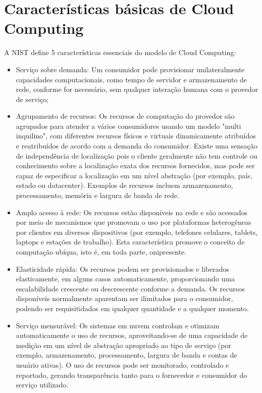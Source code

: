 \section{Características básicas de Cloud Computing}
	A NIST define 5 características essenciais do modelo de Cloud Computing:
	\begin{itemize}
		\item
			Serviço sobre demanda: Um consumidor pode provisionar unilateralmente capacidades computacionais, como tempo de servidor e armazenamento de rede, conforme for necessário, sem qualquer interação humana com o provedor de serviço;
		\item
			Agrupamento de recursos: Os recursos de computação do provedor são agrupados para atender a vários consumidores usando um modelo "multi inquilino", com diferentes recursos físicos e virtuais dinamicamente
			atribuídos e reatribuídos de acordo com a demanda do consumidor. Existe uma sensação de independência de localização pois o cliente geralmente não tem controle ou conhecimento sobre a localização exata dos recursos fornecidos, mas pode ser capaz de especificar a localização em um nível
			abstração (por exemplo, país, estado ou datacenter). Exemplos de recursos incluem armazenamento, processamento, memória e largura de banda de rede.
		\item
			Amplo acesso à rede: Os recursos estão disponíveis na rede e são acessados por meio de mecanismos que promovam o uso por plataformas heterogêneas por clientes em diversos dispositivos (por exemplo, telefones celulares, tablets, laptops e estações de trabalho). Esta característica promove o conceito de computação ubíqua, isto é, em toda parte, onipresente.
		\item
			Elasticidade rápida: Os recursos podem ser provisionados e liberados elasticamente, em alguns casos automaticamente, proporcionando uma escalabilidade crescente ou descrescente conforme a demanda. Os recursos disponíveis normalmente aparentam ser ilimitados para o consumidor, podendo ser requisitidados em qualquer quantidade e a qualquer momento.
		\item
			Serviço mensurável: Os sistemas em nuvem controlam e otimizam automaticamente o uso de recursos, aproveitando-se de uma capacidade de medição em um nível de abstração apropriado ao tipo de serviço (por exemplo, armazenamento, processamento, largura de banda e contas de usuário ativas). O uso de recursos pode ser monitorado, controlado e reportado, gerando transparência tanto para o fornecedor e consumidor do serviço utilizado.
	\end{itemize}


